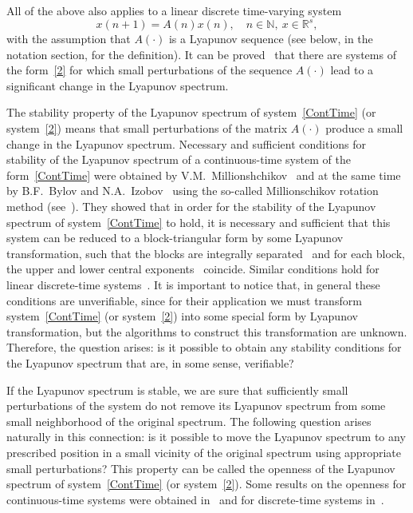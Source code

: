 \documentclass[11pt]{article}
\begin{document}
All of the above also applies to a linear discrete time-varying system 
\begin{equation}
x(n+1)=A(n)x(n),\quad n\in \mathbb{N},~x\in \mathbb{R}^{s},  \label{2}
\end{equation}%
with the assumption that $A(\cdot)$ is a Lyapunov sequence
(see below, in the notation section, for the definition). 
It can be proved~\cite{Ban} that there are systems of the form~\eqref{2} for which small perturbations 
of the sequence $A(\cdot)$ lead to a significant change in the Lyapunov spectrum. 


The stability property of the Lyapunov spectrum of system~\eqref{ContTime} (or system~\eqref{2}) 
means that small perturbations of the matrix $A(\cdot)$ produce a small change in the Lyapunov spectrum.
Necessary and sufficient
conditions for stability of the Lyapunov spectrum
of a continuous-time system of the form~\eqref{ContTime} were obtained by V.M.~Millionshchikov~\cite{Million2} 
and at the same time by B.F.~Bylov and N.A.~Izobov~\cite{BylovIzobov} using the so-called 
Millionschikov rotation method (see~\cite{Million}). 
They showed that 
in order for the
stability of the Lyapunov spectrum of system~\eqref{ContTime} to hold, it is necessary
and sufficient that this system can be reduced to a block-triangular form by
some Lyapunov transformation, 
such that the blocks are integrally separated~\cite{Bylov} and
for each block, the upper and lower central exponents~\cite{BylovIzobov,BVGN,Million2} coincide.
Similar conditions hold for linear discrete-time systems~\cite{BP}.
It is important to notice that, in general these conditions are
unverifiable, since for their application we must transform system~\eqref{ContTime} (or system~\eqref{2}) 
into some special form by Lyapunov transformation, but the algorithms to construct this transformation are unknown. 
Therefore, the question arises: is it possible to obtain any stability conditions for the Lyapunov spectrum
that are, in some sense, verifiable?

If the Lyapunov spectrum is stable, we are sure that sufficiently small perturbations 
of the system do not remove its Lyapunov spectrum from some small neighborhood of the original spectrum.
The following question arises naturally in this connection: 
is it possible to move the Lyapunov spectrum to any prescribed position in a small vicinity of the original spectrum 
using appropriate small perturbations?
This property can be called the openness of the Lyapunov spectrum of system~\eqref{ContTime} (or system~\eqref{2}).
Some results on the openness for continuous-time systems were obtained in~\cite{MP} and for discrete-time systems
in~\cite{BP}. 
\end{document}
